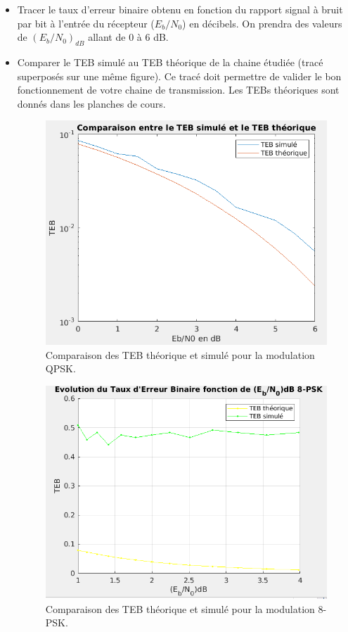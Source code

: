 \documentclass[frenchb]{article}
\begin{document}
\begin{enumerate}
\begin{itemize}
            \clearpage
            \item Tracer le taux d'erreur binaire obtenu en fonction du rapport signal à bruit par bit à l'entrée du récepteur ($E_b/N_0$) en décibels. On prendra des valeurs de $\left(E_b/N_0\right)_{dB}$ allant de $0$ à $6$ dB.
            \item Comparer le TEB simulé au TEB théorique de la chaine étudiée (tracé superposés sur une même figure). Ce tracé doit permettre de valider le bon fonctionnement de votre chaine de transmission. Les TEBs théoriques sont donnés dans les planches de cours.
   \begin{figure}[ht!]
    \centering
    \includegraphics[width=12cm]{C1teb.png}
    \caption{Comparaison des TEB théorique et simulé pour la modulation QPSK.}
    \label{C31}
 \end{figure}
 
 \begin{figure}[ht!]
    \centering
    \includegraphics[width=12cm]{C38PSKteb.png}
    \caption{Comparaison des TEB théorique et simulé pour la modulation 8-PSK.}
    \label{C32}
 \end{figure}
 

\end{itemize}
\end{enumerate}
\end{document}
